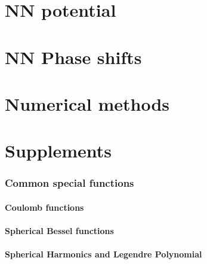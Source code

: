 \documentclass[10pt]{book}
\begin{document}
\begin{itemize}
\end{itemize}
\chapter{NN potential}
\chapter{{NN Phase shifts}}
\chapter{Numerical methods}
\chapter{Supplements}

\subsection{Common special functions}
\subsubsection{Coulomb functions}
\subsubsection{Spherical Bessel functions}
\subsubsection{Spherical Harmonics and Legendre Polynomial}
\end{document}
